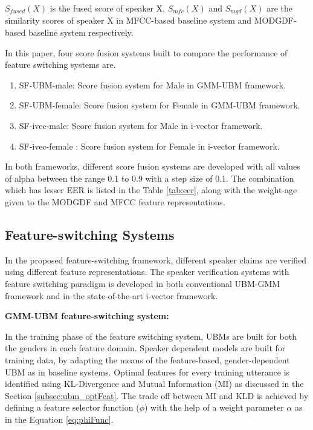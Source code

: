 \documentclass{article}
\begin{document}
	$S_{fused}\left( X \right)$ is the fused score of speaker X,  $S_{mfc}\left( X \right)$ and $S_{mgd}\left( X \right)$ are the similarity scores of speaker X in MFCC-based baseline system and MODGDF-based baseline system respectively. 

\vspace{0.25 cm}		 
	In this paper, four score fusion systems built to compare the performance of feature switching systems are. 
	\begin{enumerate}
	\item SF-UBM-male: Score fusion system for Male in GMM-UBM framework.
	\item SF-UBM-female: Score fusion system for Female in GMM-UBM framework.
	\item SF-ivec-male: Score fusion system for Male in i-vector framework.
	\item SF-ivec-female	: Score fusion system for Female in i-vector framework.
	\end{enumerate}
	In both frameworks, different score fusion systems are developed with all values of alpha between the range 0.1 to 0.9 with a step size of 0.1.  The combination which has lesser EER is listed in the Table \ref{tab:eer}, along with the weight-age given to the MODGDF and MFCC feature representations.
	
\subsection{Feature-switching Systems}
\label{subsec:featSwitch}

In the proposed feature-switching framework, different speaker claims are verified using different feature representations. The speaker verification systems with feature switching paradigm is developed in both conventional UBM-GMM framework and in the state-of-the-art i-vector framework.

\vspace{0.25 cm}	
\textbf{GMM-UBM feature-switching system:}

In the training phase of the feature switching system, UBMs are built for both the genders in each feature domain. Speaker dependent models are built for training data, by adapting the means of the feature-based, gender-dependent UBM as in baseline systems. Optimal features for every training utterance is identified using KL-Divergence and Mutual Information (MI) as  discussed in the Section \ref{subsec:ubm_optFeat}. The trade off between MI and KLD is achieved by defining a feature selector function ($\phi$) with the help of a weight parameter $\alpha$ as in the Equation \ref{eq:phiFunc}. 
\end{document}
